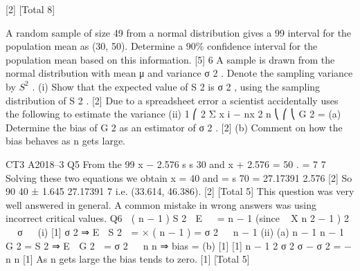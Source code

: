 \documentclass[a4paper,12pt]{article}
\begin{document}
[2]
[Total 8]
\item A random sample of size 49 from a normal distribution gives a 99%
interval for the population mean as (30, 50).
Determine a 90\% confidence interval for the population mean based on this information.
[5]
6
A sample is drawn from the normal distribution with mean μ and variance σ 2 . Denote
the sampling variance by $S^2$ .
(i)
Show that the expected value of S 2 is σ 2 , using the sampling distribution of
S 2 .
[2]
Due to a spreadsheet error a scientist accidentally uses the following to estimate the
variance
(ii)
1 ⎛ 2
Σ x i − nx 2
n ⎝
⎛
⎝
G 2 =
(a) Determine the bias of G 2 as an estimator of σ 2 .
[2]
(b) Comment on how the bias behaves as n gets large.

CT3 A2018–3 
Q5
From the 99%
x − 2.576
s
s
30 and x + 2.576 =
50 .
=
7
7
Solving these two equations we obtain
x = 40 and
=
s
70
= 27.17391
2.576
[2]
So 90%
40 ± 1.645
27.17391
7
i.e. (33.614, 46.386).
[2]
[Total 5]
This question was very well answered in general. A common mistake in
wrong answers was using incorrect critical values.
Q6
 ( n − 1 ) S 2 
E 
 = n − 1 (since ~ X n 2 − 1 )
2
  σ
 
(i)
[1]
σ 2
⇒ E  S 2  = × ( n − 1 ) =
σ 2
  n − 1
(ii)
(a)
n − 1
n − 1
G 2 = S 2 ⇒ E  G 2  = σ 2
 
n
n
⇒ bias =
(b)
[1]
[1]
n − 1 2
σ 2
σ − σ 2 = −
n
n
[1]
As n gets large the bias tends to zero.
[1]
[Total 5]
\end{document}
